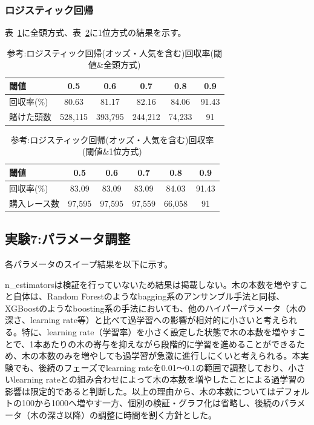 \documentclass[dvipdfmx, a4paper, 11pt, titlepage]{jsarticle}
\begin{document}
\subsubsection{ロジスティック回帰}

表~\ref{tab:exp6_logistic_odds_all}に全頭方式、表~\ref{tab:exp6_logistic_odds_top1}に1位方式の結果を示す。

\begin{table}[H]
  \centering
  \caption{参考:ロジスティック回帰(オッズ・人気を含む)回収率(閾値\&全頭方式)}
  \label{tab:exp6_logistic_odds_all}
  \begin{tabular}{lccccc}
    \toprule
    閾値 & 0.5 & 0.6 & 0.7 & 0.8 & 0.9 \\
    \midrule
    回収率(\%)   & 80.63 & 81.17 & 82.16 & 84.06 & 91.43 \\
    賭けた頭数   & 528{,}115 & 393{,}795 & 244{,}212 & 74{,}233 & 91 \\
    \bottomrule
  \end{tabular}
\end{table}

\begin{table}[H]
  \centering
  \caption{参考:ロジスティック回帰(オッズ・人気を含む)回収率(閾値\&1位方式)}
  \label{tab:exp6_logistic_odds_top1}
  \begin{tabular}{lccccc}
    \toprule
    閾値 & 0.5 & 0.6 & 0.7 & 0.8 & 0.9 \\
    \midrule
    回収率(\%)     & 83.09 & 83.09 & 83.09 & 84.03 & 91.43 \\
    購入レース数   & 97{,}595 & 97{,}595 & 97{,}559 & 66{,}058 & 91 \\
    \bottomrule
  \end{tabular}
\end{table}

\subsection{実験7:パラメータ調整}
各パラメータのスイープ結果を以下に示す。

n\_estimatorsは検証を行っていないため結果は掲載しない。木の本数を増やすこと自体は、Random Forestのようなbagging系のアンサンブル手法と同様、XGBoostのようなboosting系の手法においても、他のハイパーパラメータ（木の深さ、learning rate等）と比べて過学習への影響が相対的に小さいと考えられる。特に、learning rate（学習率）を小さく設定した状態で木の本数を増やすことで、1本あたりの木の寄与を抑えながら段階的に学習を進めることができるため、木の本数のみを増やしても過学習が急激に進行しにくいと考えられる。本実験でも、後続のフェーズでlearning rateを0.01〜0.1の範囲で調整しており、小さいlearning rateとの組み合わせによって木の本数を増やしたことによる過学習の影響は限定的であると判断した。以上の理由から、木の本数についてはデフォルトの100から1000へ増やす一方、個別の検証・グラフ化は省略し、後続のパラメータ（木の深さ以降）の調整に時間を割く方針とした。
\end{document}
